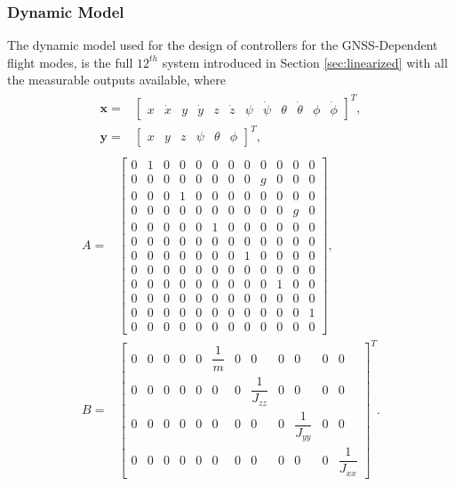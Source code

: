 \subsubsection{Dynamic Model}
The dynamic model used for the design of controllers for the GNSS-Dependent flight modes, is the full $12^{th}$ system introduced in Section \ref{sec:linearized} with all the measurable outputs available, where
\begin{align*}
\begin{split}
\mathbf{x} = & \begin{bmatrix}
x & \dot{x} & y & \dot{y} & z & \dot{z} & \psi & \dot{\psi} & \theta & \dot{\theta} & \phi & \dot{\phi}
\end{bmatrix}^{T},\\[15px]
\mathbf{y} = & \begin{bmatrix}
x & y & z & \psi & \theta & \phi
\end{bmatrix}^{T},
\end{split}
\end{align*}
\begin{align}
\begin{split}
A = & 
\begin{bmatrix}
0 & 1 & 0 & 0 & 0 & 0 & 0 & 0 & 0 & 0 & 0 & 0\\[2px]
0 & 0 & 0 & 0 & 0 & 0 & 0 & 0 & g & 0 & 0 & 0\\[2px]
0 & 0 & 0 & 1 & 0 & 0 & 0 & 0 & 0 & 0 & 0 & 0\\[2px]
0 & 0 & 0 & 0 & 0 & 0 & 0 & 0 & 0 & 0 & g & 0\\[2px]
0 & 0 & 0 & 0 & 0 & 1 & 0 & 0 & 0 & 0 & 0 & 0\\[2px]
0 & 0 & 0 & 0 & 0 & 0 & 0 & 0 & 0 & 0 & 0 & 0\\[2px]
0 & 0 & 0 & 0 & 0 & 0 & 0 & 1 & 0 & 0 & 0 & 0\\[2px]
0 & 0 & 0 & 0 & 0 & 0 & 0 & 0 & 0 & 0 & 0 & 0\\[2px]
0 & 0 & 0 & 0 & 0 & 0 & 0 & 0 & 0 & 1 & 0 & 0\\[2px]
0 & 0 & 0 & 0 & 0 & 0 & 0 & 0 & 0 & 0 & 0 & 0\\[2px]
0 & 0 & 0 & 0 & 0 & 0 & 0 & 0 & 0 & 0 & 0 & 1\\[2px]
0 & 0 & 0 & 0 & 0 & 0 & 0 & 0 & 0 & 0 & 0 & 0
\end{bmatrix}, \\[15px]
B = & 
\begin{bmatrix}
0 & 0 & 0 & 0 & 0 & \dfrac{1}{m} & 0 & 0 & 0 & 0 & 0 & 0\\[5px]
0 & 0 & 0 & 0 & 0 & 0 & 0 & \dfrac{1}{J_{zz}} & 0 & 0 & 0 & 0\\[5px]
0 & 0 & 0 & 0 & 0 & 0 & 0 & 0 & 0 & \dfrac{1}{J_{yy}} & 0 & 0\\[5px]
0 & 0 & 0 & 0 & 0 & 0 & 0 & 0 & 0 & 0 & 0 & \dfrac{1}{J_{xx}}
\end{bmatrix}^{T}.
\end{split}
\end{align}
